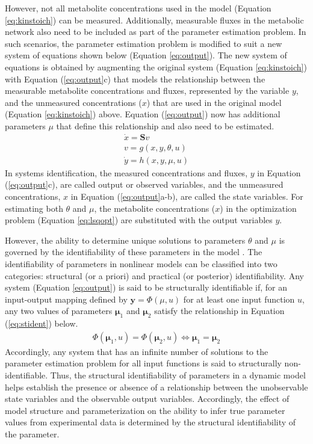 \documentclass[10pt]{article}
\begin{document}
However, not all metabolite concentrations used in the model (Equation \ref{eq:kinstoich}) can be measured. Additionally, measurable fluxes in the metabolic network also need to be included as part of the parameter estimation problem. In such scenarios, the parameter estimation problem is modified to suit a new system of equations shown below (Equation \ref{eq:output}). The new system of equations is obtained by augmenting the original system (Equation \ref{eq:kinstoich}) with Equation (\ref{eq:output}c) that models the relationship between the measurable metabolite concentrations and fluxes, represented by the variable $y$, and the unmeasured concentrations ($x$) that are used in the original model (Equation \ref{eq:kinstoich}) above. Equation (\ref{eq:output}) now has additional parameters $\mu$ that define this relationship and also need to be estimated.
\begin{subequations}\label{eq:output}
	\begin{align}
	\dot{x} = \mathbf{S}v\\
	v = g(x, y, \theta, u)\\
	\dot{y} = h(x, y, \mu, u)
	\end{align}
\end{subequations}
In systems identification, the measured concentrations and fluxes, $y$ in Equation (\ref{eq:output}c), are called output or observed variables, and the unmeasured concentrations, $x$ in Equation (\ref{eq:output}a-b), are called the state variables. 
For estimating both $\theta$ and $\mu$, the metabolite concentrations ($x$) in the optimization problem (Equation \ref{eq:lsqopt}) are substituted with the output variables $y$. 

However, the ability to determine unique solutions to parameters $\theta$ and $\mu$ is governed by the identifiability of these parameters in the model \parencite{McLean2012}. The identifiability of parameters in nonlinear models can be classified into two categories: structural (or a priori) and practical (or posterior) identifiability. 	
Any system (Equation \ref{eq:output}) is said to be structurally identifiable if, for an input-output mapping defined by $\mathbf{y} = \Phi(\mu,u)$ for at least one input function $u$, any two values of parameters $\mathbf{\mu}_1$ and $\mathbf{\mu}_2$ satisfy the relationship in Equation (\ref{eq:stident}) below.
\begin{align}\label{eq:stident}
\Phi(\mathbf{\mu}_1,u) = \Phi(\mathbf{\mu}_2,u) \iff \mathbf{\mu}_1 = \mathbf{\mu}_2
\end{align}
Accordingly, any system that has an infinite number of solutions to the parameter estimation problem for all input functions is said to structurally non-identifiable. Thus, the structural identifiability of parameters in a dynamic model helps establish the presence or absence of a relationship between the unobservable state variables and the observable output variables. Accordingly, the effect of model structure and parameterization on the ability to infer true parameter values from experimental data is determined by the structural identifiability of the parameter. 
\end{document}
